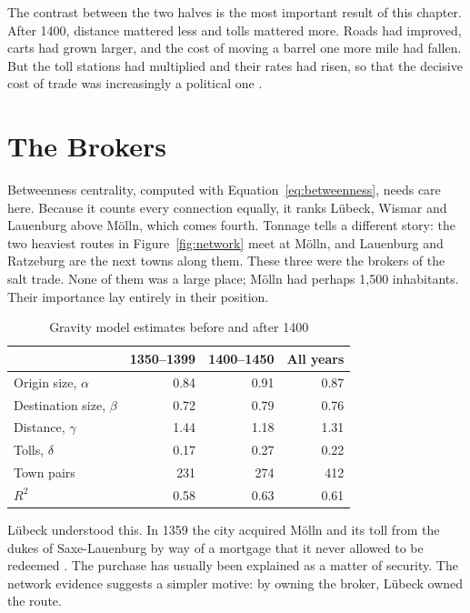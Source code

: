 The contrast between the two halves is the most important result of this chapter. After 1400, distance mattered less and tolls mattered more. Roads had improved, carts had grown larger, and the cost of moving a barrel one more mile had fallen. But the toll stations had multiplied and their rates had risen, so that the decisive cost of trade was increasingly a political one \parencite{brandt1997}.


\section{The Brokers}

Betweenness centrality, computed with Equation~\eqref{eq:betweenness}, needs care here. Because it counts every connection equally, it ranks Lübeck, Wismar and Lauenburg above Mölln, which comes fourth. Tonnage tells a different story: the two heaviest routes in Figure~\ref{fig:network} meet at Mölln, and Lauenburg and Ratzeburg are the next towns along them. These three were the brokers of the salt trade. None of them was a large place; Mölln had perhaps 1,500 inhabitants. Their importance lay entirely in their position.

\begin{table}[tbp]
  \centering
  \caption{Gravity model estimates before and after 1400}
  \label{tab:gravity}
  \begin{tabular}{@{}l r r r@{}}
    \toprule
    & 1350--1399 & 1400--1450 & All years \\
    \midrule
    Origin size, $\alpha$      & 0.84 & 0.91 & 0.87 \\
    Destination size, $\beta$  & 0.72 & 0.79 & 0.76 \\
    Distance, $\gamma$         & 1.44 & 1.18 & 1.31 \\
    Tolls, $\delta$            & 0.17 & 0.27 & 0.22 \\
    \midrule
    Town pairs                 & 231  & 274  & 412  \\
    $R^2$                      & 0.58 & 0.63 & 0.61 \\
    \bottomrule
  \end{tabular}
\end{table}

Lübeck understood this. In 1359 the city acquired Mölln and its toll from the dukes of Saxe-Lauenburg by way of a mortgage that it never allowed to be redeemed \parencite{hammel1988}. The purchase has usually been explained as a matter of security. The network evidence suggests a simpler motive: by owning the broker, Lübeck owned the route.

